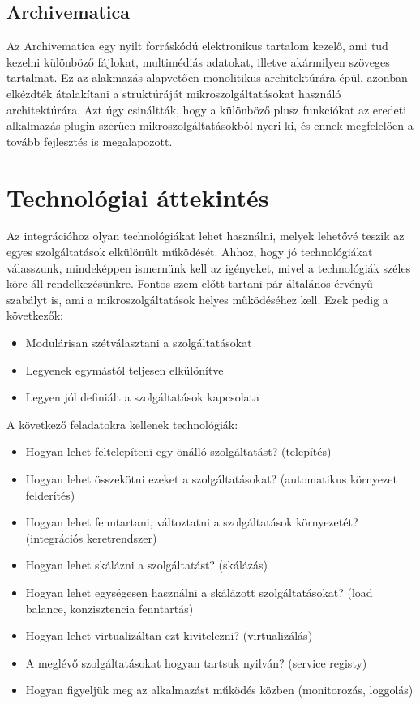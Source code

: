 \documentclass[11pt,magyar,a4paper,oneside,]{report}
\begin{document}
\section{Archivematica
\citep{archivematica}}\label{archivematica-archivematica}

Az Archivematica egy nyilt forráskódú elektronikus tartalom kezelő, ami
tud kezelni különböző fájlokat, multimédiás adatokat, illetve akármilyen
szöveges tartalmat. Ez az alakmazás alapvetően monolitikus
architektúrára épül, azonban elkézdték átalakítani a struktúráját
mikroszolgáltatásokat használó architektúrára. Azt úgy csináltták, hogy
a különböző plusz funkciókat az eredeti alkalmazás plugin szerűen
mikroszolgáltatásokból nyeri ki, és ennek megfelelően a tovább
fejlesztés is megalapozott\citep{archivematica-wiki}.

\chapter{Technológiai
áttekintés\citep{micro-introPt1}}\label{technoluxf3giai-uxe1ttekintuxe9smicro-intropt1}

Az integrációhoz olyan technológiákat lehet használni, melyek lehetővé
teszik az egyes szolgáltatások elkülönült működését. Ahhoz, hogy jó
technológiákat válasszunk, mindeképpen ismernünk kell az igényeket,
mivel a technológiák széles köre áll rendelkezésünkre. Fontos szem előtt
tartani pár általános érvényű szabályt is\citep{micro-golden}, ami a
mikroszolgáltatások helyes működéséhez kell. Ezek pedig a következők:

\begin{itemize}
\itemsep1pt\parskip0pt
\item
  Modulárisan szétválasztani a szolgáltatásokat
\item
  Legyenek egymástól teljesen elkülönítve
\item
  Legyen jól definiált a szolgáltatások kapcsolata
\end{itemize}

A következő feladatokra kellenek technológiák:

\begin{itemize}
\itemsep1pt\parskip0pt
\item
  Hogyan lehet feltelepíteni egy önálló szolgáltatást? (telepítés)
\item
  Hogyan lehet összekötni ezeket a szolgáltatásokat? (automatikus
  környezet felderítés)
\item
  Hogyan lehet fenntartani, változtatni a szolgáltatások környezetét?
  (integrációs keretrendszer)
\item
  Hogyan lehet skálázni a szolgáltatást? (skálázás)
\item
  Hogyan lehet egységesen használni a skálázott szolgáltatásokat? (load
  balance, konzisztencia fenntartás)
\item
  Hogyan lehet virtualizáltan ezt kivitelezni? (virtualizálás)
\item
  A meglévő szolgáltatásokat hogyan tartsuk nyilván? (service registy)
\item
  Hogyan figyeljük meg az alkalmazást működés közben (monitorozás,
  loggolás)
\end{itemize}
\end{document}
